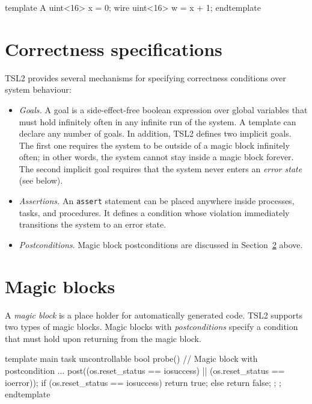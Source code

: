 \documentclass{report}
\newcommand{\src}[1]{\texttt{#1}}
\newcommand{\tsl}{TSL2 }
\begin{document}
\begin{tsllisting}{}
template A
  uint<16> x = 0;
  wire uint<16> w = x + 1;
endtemplate
\end{tsllisting}


\section{Correctness specifications}\label{s:o:correctness}

\tsl provides several mechanisms for specifying correctness 
conditions over system behaviour:
\begin{itemize}
    \item \emph{Goals.} A goal is a side-effect-free boolean 
        expression over global variables that must hold infinitely 
        often in any infinite run of the system.  A template can 
        declare any number of goals.  In addition, \tsl defines 
        two implicit goals.  The first one requires the system to 
        be outside of a magic block infinitely often; in other 
        words, the system cannot stay inside a magic block 
        forever.  The second implicit goal requires that the 
        system never enters an \emph{error state} (see below).
    \item \emph{Assertions.}  An \src{assert} statement can be 
        placed anywhere inside processes, tasks, and procedures.  
        It defines a condition whose violation immediately 
        transitions the system to an error state.
    \item \emph{Postconditions}.  Magic block postconditions are 
        discussed in Section~\ref{s:o:magic} above.
\end{itemize}



\section{Magic blocks}\label{s:o:magic}

A \emph{magic block} is a place holder for automatically generated 
code.  \tsl supports two types of magic blocks.  Magic blocks with 
\emph{postconditions} specify a condition that must hold upon 
returning from the magic block.  


\begin{tsllisting}{}
template main
  task uncontrollable bool probe() {
    // Magic block with postcondition
    {...} post((os.reset_status == iosuccess) ||
               (os.reset_status == ioerror));
    if (os.reset_status == iosuccess) {
      return true;
    } else {
      return false;
    };
};
endtemplate
\end{tsllisting}
\end{document}
